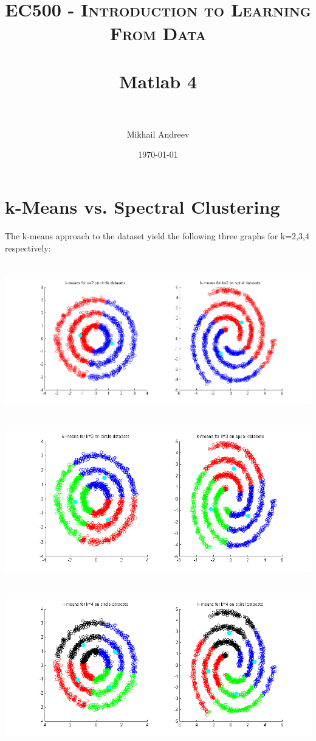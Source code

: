 \documentclass[paper=a4, fontsize=11pt]{scrartcl} %
\title{	
	\normalfont \normalsize 
	\textsc{EC500 - Introduction to Learning From Data} \\ [25pt] %
	\horrule{0.5pt} \\[0.4cm] %
	\huge Matlab 4 \\ %
	\horrule{2pt} \\[0.5cm] %
}
\author{Mikhail Andreev} %
\date{\normalsize\today} %
\numberwithin{equation}{section} %
\numberwithin{figure}{section} %
\numberwithin{table}{section} %
\begin{document}
	
	\maketitle %
	

	
	\newpage
	\section{k-Means vs. Spectral Clustering}
	The k-means approach to the dataset yield the following three graphs for k=2,3,4 respectively:\\\\\\
	\hspace*{-3cm}\includegraphics[scale=0.6]{kmeans_k2}
	\\\\\\
	\hspace*{-2.5cm}\includegraphics[scale=0.6]{kmeans_k3}
	\\\\\\
	\hspace*{-2.5cm}\includegraphics[scale=0.6]{kmeans_k4}
\end{document}
